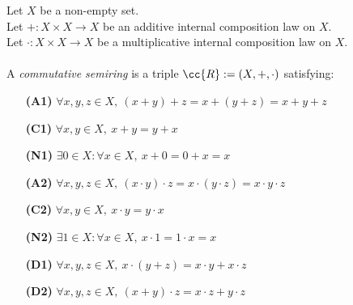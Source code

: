 \begin{definition-pre}
    \label{def:commutative_semiring}
    Let \(X\) be a non-empty set. \\
    Let \(+: X\times X \to X\) be an additive internal composition law on \(X\). \\
    Let \(\cdot: X\times X \to X\) be a multiplicative internal composition law on \(X\). \\\\
    A \textit{commutative semiring} is a triple \(\cc{R}:= (X, +, \cdot)\) satisfying:
    \begin{enumerate}
        \item [\textbf{(A1)}] \(\forall x,y,z\in X,\ (x+y)+z= x+(y+z) = x+y+z\)
        \item [\textbf{(C1)}] \(\forall x,y\in X,\ x+y = y+x\)
        \item [\textbf{(N1)}] \(\exists 0 \in X : \forall x \in X,\ x+0 = 0+x = x\)
        \item [\textbf{(A2)}] \(\forall x,y,z\in X,\ (x\cdot y)\cdot z= x\cdot(y\cdot z) = x\cdot y\cdot z\)
        \item [\textbf{(C2)}] \(\forall x,y\in X,\ x\cdot y = y\cdot x\)
        \item [\textbf{(N2)}] \(\exists 1 \in X : \forall x \in X,\ x\cdot1 = 1\cdot x = x\)
        \item [\textbf{(D1)}] \(\forall x,y,z \in X,\ x\cdot(y+z)=x\cdot y+x\cdot z\)
        \item [\textbf{(D2)}] \(\forall x,y,z \in X,\ (x+y)\cdot z=x\cdot z+y\cdot z\)
    \end{enumerate}
\end{definition-pre}

